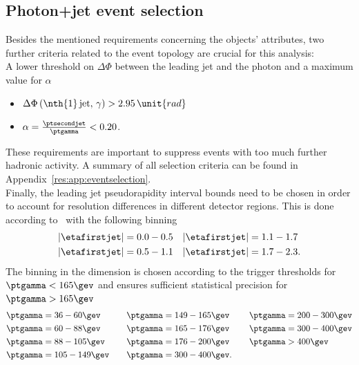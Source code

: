 \subsection*{Photon+jet event selection}
Besides the mentioned requirements concerning the objects' attributes, two further criteria related to the event topology are crucial for this analysis:\\
A lower threshold on $\Delta \Phi$ between the leading jet and the photon and a maximum value for $\alpha$
\begin{itemize}
 \item $\Delta \Phi \left(\text{\nth{1}\,jet},\,\gamma \right) > 2.95\,\unit{rad}$
 \item $\alpha = \frac{\ptsecondjet}{\ptgamma} < 0.20$.
\end{itemize}
These requirements are important to suppress events with too much further hadronic activity.
A summary of all selection criteria can be found in Appendix~\ref{res:app:eventselection}.\\

Finally, the leading jet pseudorapidity interval bounds need to be chosen in order to account for resolution differences in different detector regions.
This is done according to~\cite{bib:Matthias_Thesis} with the following binning
\begin{align*}
|\etafirstjet| &= 0.0-0.5  &&|\etafirstjet| = 1.1-1.7 \\
|\etafirstjet| &= 0.5-1.1  &&|\etafirstjet| = 1.7-2.3.
\end{align*}
The binning in the \ptgamma dimension is chosen according to the trigger thresholds for \mbox{$\ptgamma<165\gev$} and ensures sufficient statistical precision for \mbox{$\ptgamma>165\gev$}
\begin{align*}
\ptgamma &= 36 -60\gev     &  \ptgamma &= 149-165\gev   & \ptgamma &= 200-300\gev\\
\ptgamma &= 60 -88\gev     &  \ptgamma &= 165-176\gev  & \ptgamma &= 300-400\gev\\
\ptgamma &= 88 -105\gev    &  \ptgamma &= 176-200\gev  & \ptgamma &> 400\gev\\
\ptgamma &= 105-149\gev   \quad &  \ptgamma  &= 300-400\gev. \quad& \\
\end{align*}


\FloatBarrier
